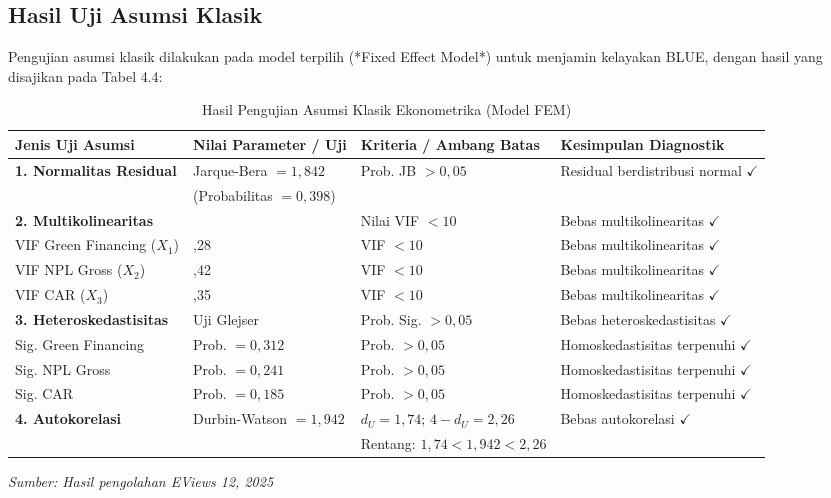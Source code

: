 \documentclass[12pt,a4paper]{article}
\numberwithin{equation}{section}
\begin{document}
\subsection{Hasil Uji Asumsi Klasik}

\noindent
Pengujian asumsi klasik dilakukan pada model terpilih (*Fixed Effect Model*) untuk menjamin kelayakan BLUE, dengan hasil yang disajikan pada Tabel 4.4:

\begin{table}[H]
  \caption{Hasil Pengujian Asumsi Klasik Ekonometrika (Model FEM)}
  \label{tab:asumsi_klasik}
  \small
  \begin{tabularx}{\textwidth}{|>{\raggedright\arraybackslash}p{2.8cm}|>{\centering\arraybackslash}p{2.2cm}|>{\centering\arraybackslash}p{2.2cm}|>{\raggedright\arraybackslash}X|}
    \hline
    \textbf{Jenis Uji Asumsi} & \textbf{Nilai Parameter / Uji} & \textbf{Kriteria / Ambang Batas} & \textbf{Kesimpulan Diagnostik} \\
    \hline
    \textbf{1. Normalitas Residual} & Jarque-Bera $= 1{,}842$ & Prob. JB $> 0{,}05$ & Residual berdistribusi normal $\checkmark$ \\
    & (Probabilitas $= 0{,}398$) & & \\
    \hline
    \textbf{2. Multikolinearitas} & & Nilai VIF $< 10$ & Bebas multikolinearitas $\checkmark$ \\
    \quad VIF Green Financing ($X_1$) & 1,28 & VIF $< 10$ & Bebas multikolinearitas $\checkmark$ \\
    \quad VIF NPL Gross ($X_2$) & 1,42 & VIF $< 10$ & Bebas multikolinearitas $\checkmark$ \\
    \quad VIF CAR ($X_3$) & 1,35 & VIF $< 10$ & Bebas multikolinearitas $\checkmark$ \\
    \hline
    \textbf{3. Heteroskedastisitas} & Uji Glejser & Prob. Sig. $> 0{,}05$ & Bebas heteroskedastisitas $\checkmark$ \\
    \quad Sig. Green Financing & Prob. $= 0{,}312$ & Prob. $> 0{,}05$ & Homoskedastisitas terpenuhi $\checkmark$ \\
    \quad Sig. NPL Gross & Prob. $= 0{,}241$ & Prob. $> 0{,}05$ & Homoskedastisitas terpenuhi $\checkmark$ \\
    \quad Sig. CAR & Prob. $= 0{,}185$ & Prob. $> 0{,}05$ & Homoskedastisitas terpenuhi $\checkmark$ \\
    \hline
    \textbf{4. Autokorelasi} & Durbin-Watson $= 1{,}942$ & $d_U = 1{,}74$; $4-d_U = 2{,}26$ & Bebas autokorelasi $\checkmark$ \\
    & & Rentang: $1{,}74 < 1{,}942 < 2{,}26$ & \\
    \hline
  \end{tabularx}
  \begin{flushleft}
    \textit{Sumber: Hasil pengolahan EViews 12, 2025}
  \end{flushleft}
\end{table}
\end{document}
